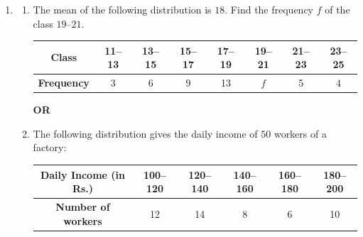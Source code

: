 \begin{enumerate}[label=\thesubsection.\arabic*, ref=\thesubsection.\theenumi]
In right triangle $\Delta ABD$, from \eqref{eq:EE26BTECH11225-trig-ratios}:
\begin{align}
    \tan 30^\circ &= \frac{AB}{BD} = \frac{AB}{x + y} \\
    &\implies \frac{1}{\sqrt{3}} = \frac{100}{100 + y} \\
    &\implies 100 + y = 100\sqrt{3} \\
    &\implies y = 100\sqrt{3} - 100 \\
    &\implies y = 100(\sqrt{3} - 1) \\
    &\implies y = 100(1.732 - 1) = 100(0.732) = 73.2\text{ m}
\end{align}
Thus, the distance between the two ships is $73.2\text{ m}$.
    \item 
    \begin{enumerate}[label=(\alph*), leftmargin=1.5em, labelsep=0.5em]
    		\item The mean of the following distribution is $18$. Find the frequency $f$ of the class $19\text{--}21$.
    
    \begin{center}
    \begin{tabular}{|c|c|c|c|c|c|c|c|}
        \hline
        \textbf{Class} & 11--13 & 13--15 & 15--17 & 17--19 & 19--21 & 21--23 & 23--25 \\ \hline
        \textbf{Frequency} & 3 & 6 & 9 & 13 & $f$ & 5 & 4 \\ \hline
    \end{tabular}
    \end{center}
        
        \vspace{0.5em}
        \begin{center}
            \textbf{OR}
        \end{center}
        \vspace{0.5em}

        \item The following distribution gives the daily income of $50$ workers of a factory:

\begin{center}
\begin{tabular}{|c|c|c|c|c|c|}
    \hline
    \textbf{Daily Income (in Rs.)} & 100--120 & 120--140 & 140--160 & 160--180 & 180--200 \\ \hline
    \textbf{Number of workers} & 12 & 14 & 8 & 6 & 10 \\ \hline
\end{tabular}
\end{center}


\end{enumerate}
\end{enumerate}
